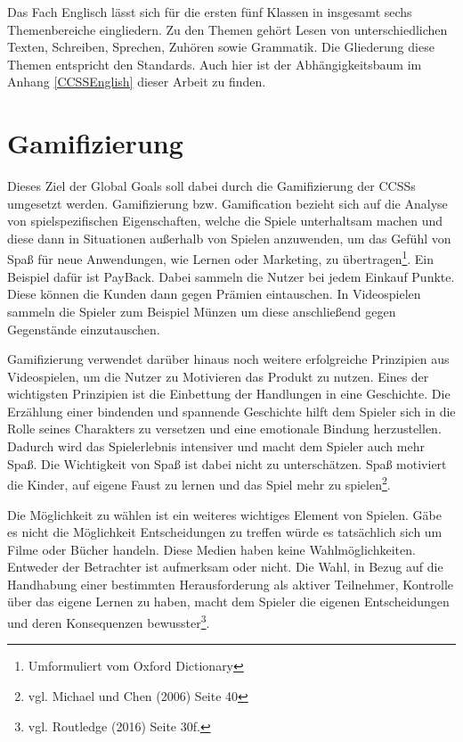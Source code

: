 Das Fach Englisch lässt sich für die ersten fünf Klassen in insgesamt sechs Themenbereiche eingliedern. Zu den Themen gehört Lesen von unterschiedlichen Texten, Schreiben, Sprechen, Zuhören sowie Grammatik. Die Gliederung diese Themen entspricht den Standards. Auch hier ist der Abhängigkeitsbaum im Anhang \ref{CCSSEnglish} dieser Arbeit zu finden.

\section{Gamifizierung}
Dieses Ziel der Global Goals soll dabei durch die Gamifizierung der \acp{CCSS} umgesetzt werden. Gamifizierung bzw. Gamification bezieht sich auf die Analyse von spielspezifischen Eigenschaften, welche die Spiele unterhaltsam machen und diese dann in Situationen außerhalb von Spielen anzuwenden, um das Gefühl von Spaß für neue Anwendungen, wie Lernen oder Marketing, zu übertragen\footnote{Umformuliert vom Oxford Dictionary}. Ein Beispiel dafür ist PayBack. Dabei sammeln die Nutzer bei jedem Einkauf Punkte. Diese können die Kunden dann gegen Prämien eintauschen. In Videospielen sammeln die Spieler zum Beispiel Münzen um diese anschließend gegen Gegenstände einzutauschen. 

Gamifizierung verwendet darüber hinaus noch weitere erfolgreiche Prinzipien aus Videospielen, um die Nutzer zu Motivieren das Produkt zu nutzen. Eines der wichtigsten Prinzipien ist die Einbettung der Handlungen in eine Geschichte. Die Erzählung einer bindenden und spannende Geschichte hilft dem Spieler sich in die Rolle seines Charakters zu versetzen und eine emotionale Bindung herzustellen. Dadurch wird das Spielerlebnis intensiver und macht dem Spieler auch mehr Spaß. Die Wichtigkeit von Spaß ist dabei nicht zu unterschätzen. Spaß motiviert die Kinder, auf eigene Faust zu lernen und das Spiel mehr zu spielen\footnote{vgl. Michael und Chen \cite{seriousGamesFun} (2006) Seite 40}.

\pagebreak
Die Möglichkeit zu wählen ist ein weiteres wichtiges Element von Spielen. Gäbe es nicht die Möglichkeit Entscheidungen zu treffen würde es tatsächlich sich um Filme oder Bücher handeln. Diese Medien haben keine Wahlmöglichkeiten. Entweder der Betrachter ist aufmerksam oder nicht. Die Wahl, in Bezug auf die Handhabung einer bestimmten Herausforderung als aktiver Teilnehmer, Kontrolle über das eigene Lernen zu haben, macht dem Spieler die eigenen Entscheidungen und deren Konsequenzen bewusster\footnote{vgl. Routledge \cite{seriousGamesPrinciples} (2016) Seite 30f.}.

